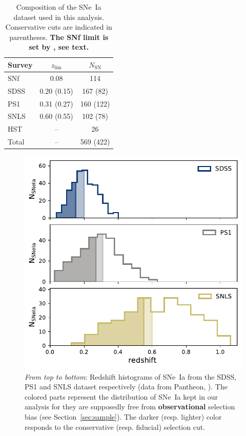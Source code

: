 \documentclass[]{aa}
\begin{document}
\begin{table}
    \centering
    \caption{Composition of the SNe~Ia dataset used in this analysis.
    Conservative cuts are indicated in parentheses. \textbf{The SNf limit is set
by \cite{rigault2020}, see text.}}
    \label{tab:sample}
    \begin{tabular}{l c c}
        \hline\hline
        Survey & $z_{\lim}$ & $N_{\mathrm{SN}}$ \\
        \hline
        SNf & 0.08 & 114 \\
        SDSS & 0.20 (0.15) & 167 (82)\\
        PS1 & 0.31 (0.27) & 160 (122)\\
        SNLS & 0.60 (0.55) & 102 (78)\\
        HST & -- & 26 \\
        \hline
        Total & -- & 569 (422) \\
        \hline
    \end{tabular}
\end{table}

\begin{figure}
    \centering
    \includegraphics[width=0.95\linewidth]{Article_figures/hist_surveys_cuts_55-cividis.pdf}
    \caption{\textit{From top to bottom}: Redshift histograms of SNe~Ia from the
        SDSS, PS1 and SNLS dataset respectively (data from Pantheon,
        \citealt{scolnic2018a}). The colored parts represent the distribution of
        SNe~Ia kept in our analysis for they are supposedly free from
    \textbf{observational} selection bias (see Section~\ref{sec:sample}). The
darker (resp. lighter) color responds to the conservative (resp. fiducial)
selection cut.}
    \label{fig:cuts}
\end{figure}
\end{document}
